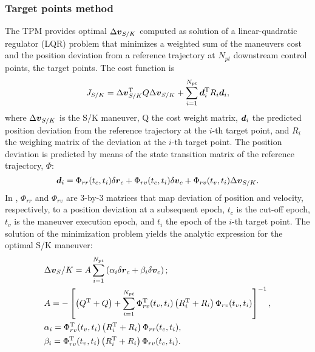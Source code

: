 \subsubsection{Target points method}\label{subsubsec:Target points Method}
The {TPM} provides optimal $\Delta\boldsymbol{v}_{S/K}$ computed as solution of a linear-quadratic regulator (LQR) problem that minimizes a weighted sum of the maneuvers cost and the position deviation from a reference trajectory at $N_{pt}$ downstream control points, \ie the target points. The cost function is
%
\begin{equation}
	J_{S/K} = \Delta\boldsymbol{v}_{S/K}^{\textrm T}Q\Delta\boldsymbol{v}_{S/K}+\sum_{i=1}^{N_{pt}}\boldsymbol{d}_i^{\textrm T}R_i\boldsymbol{d}_i,
\end{equation} 
%
where $\Delta\boldsymbol{v}_{S/K}$ is the S/K maneuver, Q the cost weight matrix, $\boldsymbol{d}_i$ the predicted position deviation from the reference trajectory at the $i$-th target point, and $R_i$ the weighing matrix of the deviation at the $i$-th target point. The position deviation is predicted by means of the state transition matrix of the reference trajectory, $\Phi$:
%
\begin{equation}
\label{eq:posdevSTM}
	\boldsymbol{d}_i = \Phi_{rr}(t_c,t_i)\delta\boldsymbol{r}_c+\Phi_{rv}(t_c,t_i)\delta\boldsymbol{v}_c+\Phi_{rv}(t_v,t_i)\Delta\boldsymbol{v}_{S/K}.
\end{equation}
%
In , $\Phi_{rr}$ and $\Phi_{rv}$ are $3$-by-$3$ matrices that map deviation of position and velocity, respectively, to a position deviation at a subsequent epoch, $t_c$ is the cut-off epoch, $t_v$ is the maneuver execution epoch, and $t_i$ the epoch of the $i$-th target point. The solution of the minimization problem yields the analytic expression for the optimal S/K maneuver:
%
\begin{equation}
\label{eq:TargetPointsMethoddv}
\begin{aligned}
&\Delta\boldsymbol{v}_S/K = A\sum_{i=1}^{N_{pt}}\left(\alpha_i\delta\boldsymbol{r}_c+\beta_i\delta\boldsymbol{v}_c\right); \\
&A = -\left[\left(Q^{\textrm T}+Q\right)+\sum_{i=1}^{N_{pt}}\Phi_{rv}^{\textrm T}(t_v,t_i)\left(R_i^{\textrm T}+R_i\right)\Phi_{rv}(t_v,t_i)\right]^{-1}, \\
&\alpha_i = \Phi_{rv}^{\textrm T}(t_v,t_i)\left(R_i^{\textrm T}+R_i\right)\Phi_{rr}(t_c,t_i), \\
&\beta_i = \Phi_{rv}^{\textrm T}(t_v,t_i)\left(R_i^{\textrm T}+R_i\right)\Phi_{rv}(t_c,t_i).
\end{aligned}
\end{equation}
%

